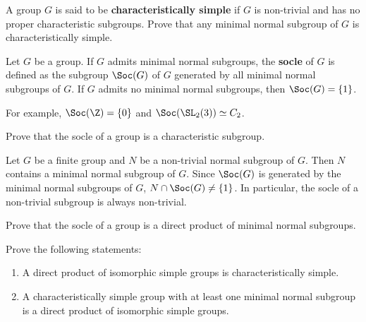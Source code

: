 \begin{exercise}
\label{xca:characteristically_simple}
    A group $G$ is said to be \textbf{characteristically simple} if $G$ is non-trivial 
    and has no proper characteristic subgroups. 
    Prove that any minimal normal subgroup of $G$ is characteristically simple. 
\end{exercise}

\begin{definition}
    Let $G$ be a group. If $G$ admits minimal normal subgroups, the \textbf{socle} of $G$ 
    is defined as the subgroup $\Soc(G)$ of $G$ generated by all minimal normal subgroups of $G$. If $G$ admits no minimal normal subgroups, 
    then $\Soc(G)=\{1\}$. 
\end{definition}

For example, $\Soc(\Z)=\{0\}$ and $\Soc(\SL_2(3))\simeq C_2$. 

\begin{exercise}
    \label{xca:socle_characteristic}
    Prove that the socle of a group is a characteristic subgroup. 
\end{exercise}

Let $G$ be a finite group and $N$ be a non-trivial normal subgroup of $G$. Then 
$N$ contains a minimal normal subgroup of $G$. Since 
$\Soc(G)$ is generated by the minimal normal subgroups of $G$, 
$N\cap\Soc(G)\ne\{1\}$. In particular, the socle of a non-trivial subgroup is always non-trivial. 



\begin{exercise}
\label{xca:Soc_direct_product}
    Prove that the socle of a group is a direct product of minimal normal subgroups. 
\end{exercise}

\begin{exercise}
\label{xca:caracteristically_simple}
Prove the following statements:
    \begin{enumerate}
        \item A direct product of isomorphic simple groups is characteristically simple.
        \item A characteristically simple group with at least one minimal normal subgroup is a direct product of isomorphic simple groups. 
    \end{enumerate}
\end{exercise}

